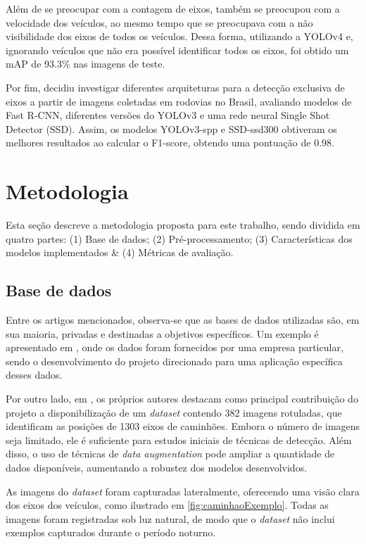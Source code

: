 \documentclass[12pt]{article}
\begin{document}
    Além de se preocupar com a contagem de eixos, \cite{Miles2022} também se preocupou com a velocidade dos veículos, ao mesmo tempo que se preocupava com a não visibilidade dos eixos de todos os veículos. Dessa forma, utilizando a YOLOv4 e, ignorando veículos que não era possível identificar todos os eixos, foi obtido um mAP de 93.3\% nas imagens de teste.

    Por fim, \cite{marcomini2023truckaxledetectionconvolutional} decidiu investigar diferentes arquiteturas para a detecção exclusiva de eixos a partir de imagens coletadas em rodovias no Brasil, avaliando modelos de Fast R-CNN, diferentes versões do YOLOv3 e uma rede neural Single Shot Detector (SSD). Assim, os modelos YOLOv3-spp e SSD-ssd300 obtiveram os melhores resultados ao calcular o F1-score, obtendo uma pontuação de 0.98.

\section{Metodologia}

    Esta seção descreve a metodologia proposta para este trabalho, sendo dividida em quatro partes: (1) Base de dados; (2) Pré-processamento; (3) Características dos modelos implementados \& (4) Métricas de avaliação. 

    \subsection{Base de dados}
        Entre os artigos mencionados, observa-se que as bases de dados utilizadas são, em sua maioria, privadas e destinadas a objetivos específicos. Um exemplo é apresentado em \cite{Miles2022}, onde os dados foram fornecidos por uma empresa particular, sendo o desenvolvimento do projeto direcionado para uma aplicação específica desses dados.
        
        Por outro lado, em \cite{marcomini2023truckaxledetectionconvolutional}, os próprios autores destacam como principal contribuição do projeto a disponibilização de um \textit{dataset} contendo 382 imagens rotuladas, que identificam as posições de 1303 eixos de caminhões. Embora o número de imagens seja limitado, ele é suficiente para estudos iniciais de técnicas de detecção. Além disso, o uso de técnicas de \textit{data augmentation }pode ampliar a quantidade de dados disponíveis, aumentando a robustez dos modelos desenvolvidos.
        
        As imagens do \textit{dataset} foram capturadas lateralmente, oferecendo uma visão clara dos eixos dos veículos, como ilustrado em \ref{fig:caminhaoExemplo}. Todas as imagens foram registradas sob luz natural, de modo que o \textit{dataset} não inclui exemplos capturados durante o período noturno.
\end{document}
